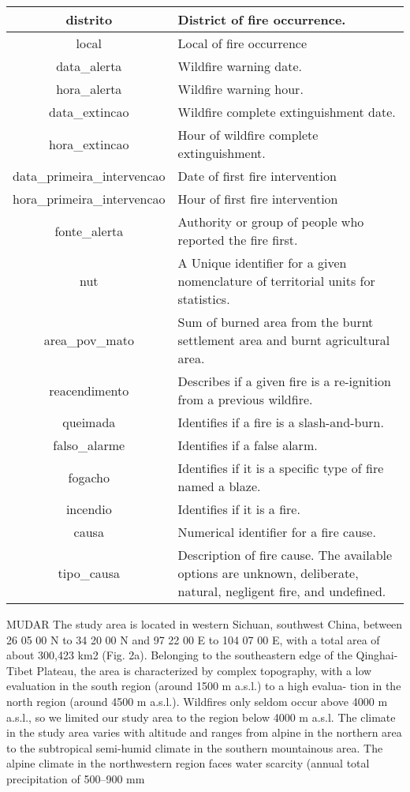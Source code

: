 \begin{table}[h!]
\begin{tabular}{|c|p{7.5cm}|}
distrito  & District of fire occurrence. \\
\hline


local  & Local of fire occurrence \\
\hline


data\_alerta  & Wildfire warning date. \\
\hline
hora\_alerta  & Wildfire warning hour. \\
\hline
data\_extincao & Wildfire complete extinguishment date. \\
\hline
hora\_extincao & Hour of wildfire complete extinguishment. \\
\hline
data\_primeira\_intervencao & Date of first fire intervention \\
\hline
hora\_primeira\_intervencao & Hour of first fire intervention \\
\hline
fonte\_alerta & Authority or group of people who reported the fire first. \\
\hline
nut & A Unique identifier for a given nomenclature of territorial units for statistics. \\
\hline



area\_pov\_mato & Sum of burned area from the burnt settlement area and burnt agricultural area.\\
\hline

reacendimento & Describes if a given fire is a re-ignition from a previous wildfire. \\
\hline
queimada & Identifies if a fire is a slash-and-burn. \\
\hline
falso\_alarme & Identifies if a false alarm. \\
\hline
fogacho & Identifies if it is a specific type of fire named a blaze. \\
\hline
incendio & Identifies if it is a fire. \\
\hline
causa & Numerical identifier for a fire cause. \\
\hline
tipo\_causa & Description of fire cause. The available options are unknown, deliberate, natural, negligent fire, and undefined. \\
\hline
\end{tabular}
\end{table}



MUDAR
The study area is located in western Sichuan, southwest China, between 26 05 00 N to 34 20 00 N and 97 22 00 E to 104 07 00 E, with a
total area of about 300,423 km2
(Fig. 2a). Belonging to the southeastern edge of the Qinghai-Tibet
Plateau, the area is characterized by complex topography, with a low
evaluation in the south region (around 1500 m a.s.l.) to a high evalua-
tion in the north region (around 4500 m a.s.l.). Wildfires only seldom
occur above 4000 m a.s.l., so we limited our study area to the region
below 4000 m a.s.l.
The climate in the study area varies with altitude and ranges from
alpine in the northern area to the subtropical semi-humid climate in the
southern mountainous area. The alpine climate in the northwestern
region faces water scarcity (annual total precipitation of 500–900 mm


